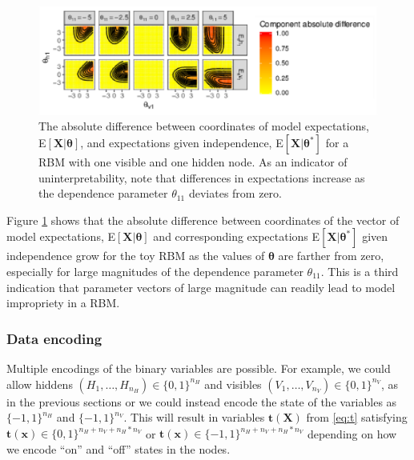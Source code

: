 \documentclass[]{article}
\theoremstyle{definition}
\newcommand{\nv}{{n_{\scriptscriptstyle V}}}
\newcommand{\nh}{{n_{\scriptscriptstyle H}}}
\begin{document}
\par
\begin{figure}

{\centering \includegraphics{paper_files/figure-latex/uninterp-1} 

}

\caption{The absolute difference between coordinates of model expectations, E$\left[\boldsymbol X | \boldsymbol \theta\right]$, and expectations given independence, E$\left[\boldsymbol X | \boldsymbol \theta^* \right ]$ for a RBM with one visible and one hidden node. As an indicator of uninterpretability, note that differences in expectations increase as the dependence parameter $\theta_{11}$ deviates from zero.}\label{fig:uninterp}
\end{figure}
Figure \ref{fig:uninterp} shows that the absolute difference between
coordinates of the vector of model expectations,
E\(\left[\boldsymbol X | \boldsymbol \theta\right]\) and corresponding
expectations E\(\left[\boldsymbol X | \boldsymbol \theta^*\right ]\)
given independence grow for the toy RBM as the values of
\(\boldsymbol \theta\) are farther from zero, especially for large
magnitudes of the dependence parameter \(\theta_{11}\). This is a third
indication that parameter vectors of large magnitude can readily lead to
model impropriety in a RBM.

\hypertarget{data-encoding}{%
\subsubsection{Data encoding}\label{data-encoding}}

Multiple encodings of the binary variables are possible. For example, we
could allow hiddens \((H_1, \dots, H_\nh) \in \{0,1\}^\nh\) and visibles
\((V_1, \dots, V_\nv) \in \{0,1\}^\nv\), as in the previous sections or
we could instead encode the state of the variables as \(\{-1,1\}^\nh\)
and \(\{-1,1\}^\nv\). This will result in variables
\(\boldsymbol t(\boldsymbol X)\) from \eqref{eq:t} satisfying
\(\boldsymbol t(\boldsymbol x) \in \{0,1\}^{\nh + \nv + \nh*\nv}\) or
\(\boldsymbol t(\boldsymbol x) \in \{-1,1\}^{\nh + \nv + \nh*\nv}\)
depending on how we encode ``on'' and ``off'' states in the nodes.
\end{document}
